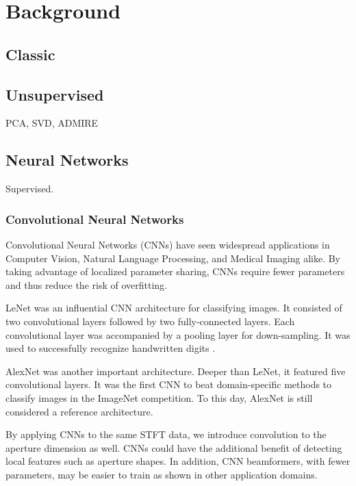 \chapter{Background}


\section{Classic} %

\section{Unsupervised} %

PCA, SVD, ADMIRE



\section{Neural Networks} %
Supervised.

\subsection{Convolutional Neural Networks}

Convolutional Neural Networks (CNNs) have seen widespread applications in Computer Vision, Natural Language Processing, and Medical Imaging alike. By taking advantage of localized parameter sharing, CNNs require fewer parameters and thus reduce the risk of overfitting.

LeNet was an influential CNN architecture for classifying images. It consisted of two convolutional layers followed by two fully-connected layers. Each convolutional layer was accompanied by a pooling layer for down-sampling. It was used to successfully recognize handwritten digits \cite{lenet}. %

AlexNet was another important architecture. Deeper than LeNet, it featured five convolutional layers. It was the first CNN to beat domain-specific methods to classify images in the ImageNet competition. To this day, AlexNet is still considered a reference architecture. %

By applying CNNs to the same STFT data, we introduce convolution to the aperture dimension as well. CNNs could have the additional benefit of detecting local features such as aperture shapes. In addition, CNN beamformers, with fewer parameters, may be easier to train as shown in other application domains.


